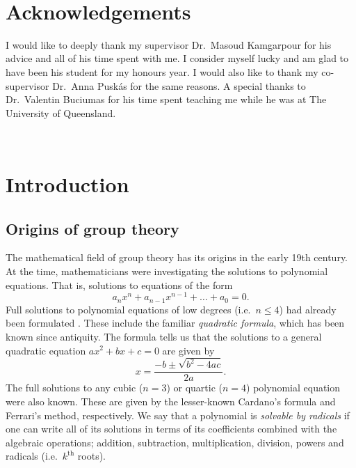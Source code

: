 \documentclass[11pt]{amsart}
\theoremstyle{remark}
\begin{document}
\
\newpage

\section*{Acknowledgements}
I would like to deeply thank my supervisor Dr.\ Masoud Kamgarpour for his advice and all of his time spent with me. I consider myself lucky and am glad to have been his student for my honours year. I would also like to thank my co-supervisor Dr.\ Anna Puskás for the same reasons. A special thanks to Dr.\ Valentin Buciumas for his time spent teaching me while he was at The University of Queensland.
\newpage

\
\newpage

\section*{Introduction}
\subsection*{Origins of group theory}
The mathematical field of group theory has its origins in the early 19th century.
At the time, mathematicians were investigating the solutions to polynomial equations.
That is, solutions to equations of the form
\[
	a_nx^n + a_{n-1}x^{n-1} + \ldots + a_0 = 0.
\]
Full solutions to polynomial equations of low degrees (i.e.\ $n \leq 4$) had already been formulated \cite{Riggs96}.
These include the familiar \emph{quadratic formula}, which has been known since antiquity.
The formula tells us that the solutions to a general quadratic equation $ax^2 + bx + c = 0$ are given by
\[
	x = \frac{-b\pm\sqrt{b^2-4ac}}{2a}.
\]
The full solutions to any cubic ($n=3$) or quartic ($n=4$) polynomial equation were also known.
These are given by the lesser-known Cardano's formula and Ferrari's method, respectively.
We say that a polynomial is \emph{solvable by radicals} if one can write all of its solutions in terms of its coefficients combined with the algebraic operations; addition, subtraction, multiplication, division, powers and radicals (i.e.\ $k^\text{th}$ roots).
\end{document}
